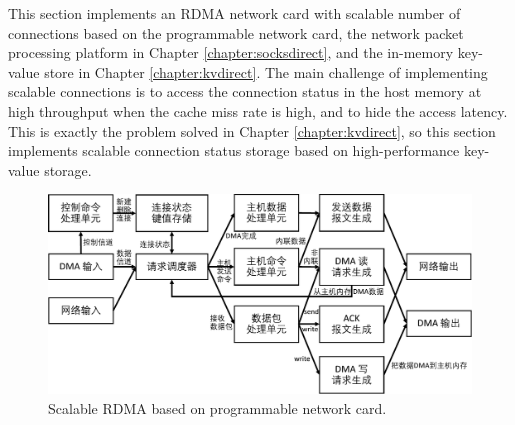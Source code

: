 This section implements an RDMA network card with scalable number of connections based on the programmable network card, the network packet processing platform in Chapter \ref{chapter:socksdirect}, and the in-memory key-value store in Chapter \ref{chapter:kvdirect}. The main challenge of implementing scalable connections is to access the connection status in the host memory at high throughput when the cache miss rate is high, and to hide the access latency. This is exactly the problem solved in Chapter \ref{chapter:kvdirect}, so this section implements scalable connection status storage based on high-performance key-value storage.

\begin{figure}[htbp]
	\centering
	\includegraphics[width=1.0\textwidth]{images/scalable_rdma.pdf}	
	\caption{Scalable RDMA based on programmable network card.}
	\label{socksdirect:fig:scalable-rdma}
\end{figure}

